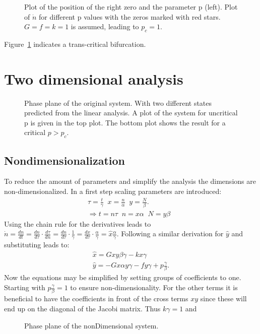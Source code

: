 \begin{figure}

\caption{Plot of the position of the right zero and the parameter p (left). Plot of $\dot{n}$ for different p values with the zeros marked with red stars. $G=f=k=1$ is assumed, leading to $p_c = 1$.}
\label{fig:transBif}
\end{figure}
Figure~\ref{fig:transBif} indicates a trans-critical bifurcation.

\section{Two dimensional analysis}
\begin{figure}


\caption{Phase plane of the original system. With two different states predicted from the linear analysis. A plot of the system for uncritical p is given in the top plot. The bottom plot shows the result for a critical $p > p_c$.}
\end{figure}
\subsection{Nondimensionalization}
To reduce the amount of parameters and simplify the analysis the dimensions are non-dimensionalized. In a first step scaling parameters are introduced:
\begin{eqnarray}
\tau = \frac{t}{\gamma} \;\; x = \frac{n}{\alpha} \;\; y = \frac{N}{\beta}. \\
\Rightarrow t = n\tau \;\;  n = x\alpha \;\; N = y\beta \;\;  
\end{eqnarray}
Using the chain rule for the derivatives leads to $\dot{n} = \frac{dn}{dt} = \frac{dn}{d\tau} \cdot \frac{d\tau}{dn} = \frac{dn}{d\tau} \cdot \frac{1}{\gamma} = \frac{dx}{d\tau} \cdot  \frac{\alpha}{\gamma} = \hat{x} \frac{\alpha}{\gamma}$. 
Following a similar derivation for $\hat{y}$ and substituting leads to:
\begin{eqnarray}
\hat{x} = Gxy\beta \gamma - kx\gamma \\
\hat{y} = -Gx\alpha y \gamma - fy \gamma + p\frac{\gamma}{\beta}.
\end{eqnarray}
Now the equations may be simplified by setting groups of coefficients to one. Starting with $p\frac{\gamma}{\beta} = 1$ to ensure non-dimensionality. For the other terms it is beneficial to have the coefficients in front of the cross terms $xy$ since these will end up on the diagonal of the Jacobi matrix. Thus $k\gamma = 1$ and 


\begin{figure}


%
\caption{Phase plane of the nonDimensional system.}
\end{figure}




